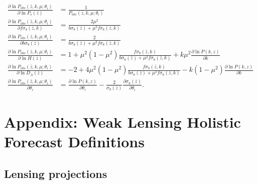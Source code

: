 \begin{subequations}

\begin{align}
\frac{\partial\ln P_{obs}\left(\bar{z},k,\mu;\theta_{i}\right)}{\partial\ln P_{s}(\bar{z})} & =\frac{1}{P_{obs}\left(\bar{z},k,\mu;\theta_{i}\right)}\\
\frac{\partial\ln P_{obs}\left(\bar{z},k,\mu;\theta_{i}\right)}{\partial f \sigma_8(\bar{z},k)} & = \frac{2 \mu^2}{b\sigma_8(\bar{z}) + \mu^2 f \sigma_8(\bar{z},k)}\\
\frac{\partial\ln P_{obs}\left(\bar{z},k,\mu;\theta_{i}\right)}{\partial b\sigma_8(\bar{z})} & = \frac{2 }{b\sigma_8(\bar{z}) + \mu^2 f \sigma_8(\bar{z},k)}\\
\frac{\partial\ln P_{obs}\left(\bar{z},k,\mu;\theta_{i}\right)}{\partial\ln H(\bar{z})} & = 1 + \mu^2 \left(1 - \mu^2\right) \frac{ f \sigma_8(\bar{z},k)
  }{b\sigma_8(\bar{z}) + 
     \mu^2 f \sigma_8(\bar{z},k)} + k \mu^2 \frac{\partial \ln P(k,z)}{\partial k}\\
\frac{\partial\ln P_{obs}\left(\bar{z},k,\mu;\theta_{i}\right)}{\partial\ln D_{A}(\bar{z})} & =  
-2 + 4 \mu^2 \left(1 - \mu^2\right)\frac{ f \sigma_8(\bar{z},k)}{
  b\sigma_8(\bar{z}) + \mu^2 f \sigma_8(\bar{z},k)} - 
k (1 - \mu^2) \frac{\partial \ln P(k,z)}{\partial k}
\\
\frac{\partial\ln P_{obs}\left(\bar{z},k,\mu;\theta_{i}\right)}{\partial \theta_i} & = \frac{\partial \ln P(k,z)}{\partial \theta_i} - 
\frac{2}{\sigma_8(\bar{z})} \frac{\partial \sigma_8(\bar{z})}{\partial \theta_i}. \label{eq: partial-derivs-subeqns-sigma8}
\end{align}
\label{eq: partial-derivs-subeqns}

\end{subequations}


\section*{Appendix: Weak Lensing Holistic Forecast Definitions}

\subsection{Lensing projections}

